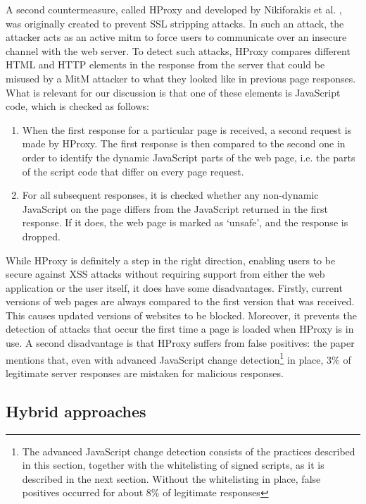 A second countermeasure, called HProxy and developed by Nikiforakis et al. \cite{Nikiforakis2010a}, was originally created to prevent SSL stripping attacks. In such an attack, the attacker acts as an active \gls{mitm} to force users to communicate over an insecure channel with the web server. To detect such attacks, HProxy compares different HTML and HTTP elements in the response from the server that could be misused by a MitM attacker to what they looked like in previous page responses. What is relevant for our discussion is that one of these elements is JavaScript code, which is checked as follows:
\begin{enumerate}
	\item When the first response for a particular page is received, a second request is made by HProxy. The first response is then compared to the second one in order to identify the dynamic JavaScript parts of the web page, i.e. the parts of the script code that differ on every page request.
	\item For all subsequent responses, it is checked whether any non-dynamic JavaScript on the page differs from the JavaScript returned in the first response. If it does, the web page is marked as `unsafe', and the response is dropped.
\end{enumerate}
While HProxy is definitely a step in the right direction, enabling users to be secure against XSS attacks without requiring support from either the web application or the user itself, it does have some disadvantages. Firstly, current versions of web pages are always compared to the first version that was received. This causes updated versions of websites to be blocked. Moreover, it prevents the detection of attacks that occur the first time a page is loaded when HProxy is in use. A second disadvantage is that HProxy suffers from false positives: the paper mentions that, even with advanced JavaScript change detection\footnote{The advanced JavaScript change detection consists of the practices described in this section, together with the whitelisting of signed scripts, as it is described in the next section. Without the whitelisting in place, false positives occurred for about 8\% of legitimate responses} in place, 3\% of legitimate server responses are mistaken for malicious responses.

\subsection{Hybrid approaches}

